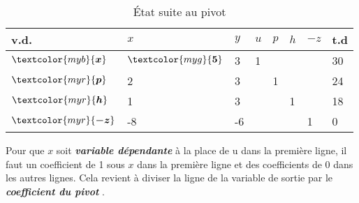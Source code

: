 \documentclass{report}
\begin{document}
\begin{multicols*}{2}
        \begin{table}[H]
                \begin{center}
                    \renewcommand{\arraystretch}{1.5}
                    \selectfont
                    \footnotesize
                        \begin{tabular}{|l|l l l l l |l|l|}
                        \arrayrulecolor{blue}
                        \hline
                        v.d. & $x$
                             & $y$ & $u$ & $p$ & $h$ & $-z$ & t.d 
                        \\
                        \hline
                        \arrayrulecolor{black}
                        $\textcolor{myb}{\boldsymbol{x}} 
                        $     & $\textcolor{myg}{\boldsymbol{5}}$ 
                                & 3
                                & 1
                                & 
                                & &  &  30
                        \\
                        $\textcolor{myr}{\boldsymbol{p}} $     
                               & 2
                               & 3
                               & & 1
                               & & & 24 
                        \\
                        $\textcolor{myr}{\boldsymbol{h}} $     
                               & 1
                               & 3 
                               &  & 
                               &  1
                               & & 18 
                        \\ 
                        \hline
                        $\textcolor{myr}{\boldsymbol{-z}}$ 
                               & -8
                                & -6
                                & 
                                & 
                                & 
                                & 1 & 0 
                        \\
                        \hline 



                        \end{tabular}
                \end{center}
        \caption{État suite au pivot}
        \end{table}
    Pour que $x$ soit \textcolor{myr}{\textbf{\textit{variable dépendante }}} 
    à la place de u dans la première ligne, il faut un 
    coefficient de 1 sous $x$ dans la première ligne et des coefficients de 0 dans les autres 
    lignes. Cela revient à diviser la ligne de la variable de sortie par le 
    \textcolor{myg}{\textbf{\textit{coefficient du pivot}}} .


\end{multicols*}
\end{document}
